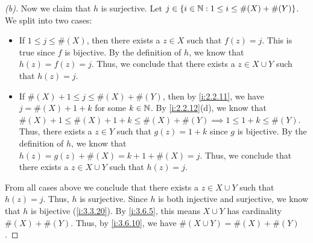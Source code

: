 \begin{proof}[(b)]
  Now we claim that \(h\) is surjective.
  Let \(j \in \left\lbrace i \in \mathbb{N} : 1 \leq i \leq \#(X) + \#(Y)\right\rbrace\).
  We split into two cases:
  \begin{itemize}
    \item If \(1 \leq j \leq \#(X)\), then there exists a \(z \in X\) such that \(f(z) = j\).
          This is true since \(f\) is bijective.
          By the definition of \(h\), we know that \(h(z) = f(z) = j\).
          Thus, we conclude that there exists a \(z \in X \cup Y\) such that \(h(z) = j\).
    \item If \(\#(X) + 1 \leq j \leq \#(X) + \#(Y)\), then by \cref{i:2.2.11}, we have \(j = \#(X) + 1 + k\) for some \(k \in \mathbb{N}\).
          By \cref{i:2.2.12}(d), we know that \(\#(X) + 1 \leq \#(X) + 1 + k \leq \#(X) + \#(Y) \implies 1 \leq 1 + k \leq \#(Y)\).
          Thus, there exists a \(z \in Y\) such that \(g(z) = 1 + k\) since \(g\) is bijective.
          By the definition of \(h\), we know that \(h(z) = g(z) + \#(X) = k + 1 + \#(X) = j\).
          Thus, we conclude that there exists a \(z \in X \cup Y\) such that \(h(z) = j\).
  \end{itemize}
  From all cases above we conclude that there exists a \(z \in X \cup Y\) such that \(h(z) = j\).
  Thus, \(h\) is surjective.
  Since \(h\) is both injective and surjective, we know that \(h\) is bijective (\cref{i:3.3.20}).
  By \cref{i:3.6.5}, this means \(X \cup Y\) has cardinality \(\#(X) + \#(Y)\).
  Thus, by \cref{i:3.6.10}, we have \(\#(X \cup Y) = \#(X) + \#(Y)\).
\end{proof}

